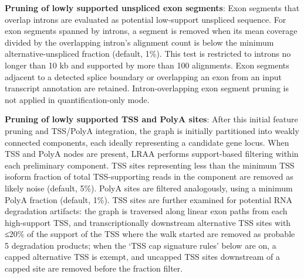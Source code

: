 \textbf{Pruning of lowly supported unspliced exon segments}: Exon segments that overlap introns are evaluated as potential low-support unspliced sequence. For exon segments spanned by introns, a segment is removed when its mean coverage divided by the overlapping intron's alignment count is below the minimum alternative-unspliced fraction (default, 1\%). This test is restricted to introns no longer than 10 kb and supported by more than 100 alignments. Exon segments adjacent to a detected splice boundary or overlapping an exon from an input transcript annotation are retained. Intron-overlapping exon segment pruning is not applied in quantification-only mode.

\textbf{Pruning of lowly supported TSS and PolyA sites}: After this initial feature pruning and TSS/PolyA integration, the graph is initially partitioned into weakly connected components, each ideally representing a candidate gene locus. When TSS and PolyA nodes are present, LRAA performs support-based filtering within each preliminary component. TSS sites representing less than the minimum TSS isoform fraction of total TSS-supporting reads in the component are removed as likely noise (default, 5\%). PolyA sites are filtered analogously, using a minimum PolyA fraction (default, 1\%). TSS sites are further examined for potential RNA degradation artifacts: the graph is traversed along linear exon paths from each high-support TSS, and transcriptionally downstream alternative TSS sites with ≤20\% of the support of the TSS where the walk started are removed as probable 5\p{} degradation products; when the `TSS cap signature rules' below are on, a capped alternative TSS is exempt, and uncapped TSS sites downstream of a capped site are removed before the fraction filter.

